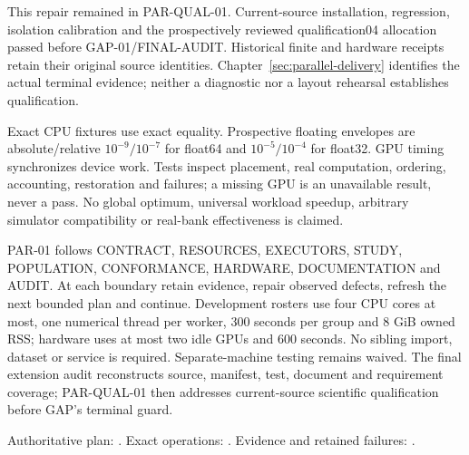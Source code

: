 This repair remained in PAR-QUAL-01. Current-source installation, regression,
isolation calibration and the prospectively reviewed qualification04 allocation
passed before GAP-01/FINAL-AUDIT. Historical finite and hardware receipts
retain their original source identities. Chapter~\ref{sec:parallel-delivery}
identifies the actual terminal evidence; neither a diagnostic nor a layout
rehearsal establishes qualification.

Exact CPU fixtures use exact equality. Prospective floating envelopes are
absolute/relative $10^{-9}/10^{-7}$ for float64 and $10^{-5}/10^{-4}$ for
float32. GPU timing synchronizes device work. Tests inspect placement, real
computation, ordering, accounting, restoration and failures; a missing GPU is
an unavailable result, never a pass. No global optimum, universal workload
speedup, arbitrary simulator compatibility or real-bank effectiveness is claimed.

PAR-01 follows CONTRACT, RESOURCES, EXECUTORS, STUDY, POPULATION, CONFORMANCE,
HARDWARE, DOCUMENTATION and AUDIT. At each boundary retain evidence, repair
observed defects, refresh the next bounded plan and continue. Development
rosters use four CPU cores at most, one numerical thread per worker, 300 seconds
per group and 8 GiB owned RSS; hardware uses at most two idle GPUs and 600
seconds. No sibling import, dataset or service is required. Separate-machine
testing remains waived. The final extension audit reconstructs source,
manifest, test, document and requirement coverage; PAR-QUAL-01 then addresses
current-source scientific qualification before GAP's terminal guard.

Authoritative plan: .
Exact operations: .
Evidence and retained failures: .
